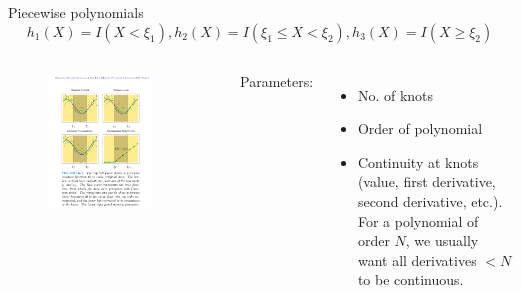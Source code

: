 \documentclass[aspectratio=169]{beamer}
\begin{document}
\begin{frame}{Piecewise polynomials}
    \begin{equation*}
        h_1(X) = I(X < \xi_1), h_2(X) = I(\xi_1 \leq X < \xi_2), h_3(X) = I(X \geq \xi_2)
    \end{equation*}
    \begin{columns}
    \begin{figure}
        \centering
        \includegraphics[width=0.8\textwidth]{figures/piecewisefits.pdf}
    \end{figure}
    Parameters:
    \begin{itemize}
        \item No. of knots
        \item Order of polynomial
        \item Continuity at knots (value, first derivative, second derivative, etc.). For a polynomial of order $N$, we usually want all derivatives $< N$ to be continuous. 
    \end{itemize}
    \end{columns}
\end{frame} 
\end{document}
